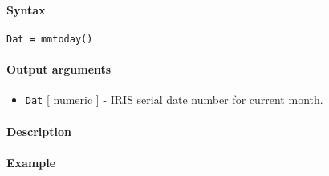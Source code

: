 


	\paragraph{Syntax}

\begin{verbatim}
Dat = mmtoday()
\end{verbatim}

\paragraph{Output arguments}

\begin{itemize}
\itemsep1pt\parskip0pt
\item
  \texttt{Dat} {[} numeric {]} - IRIS serial date number for current
  month.
\end{itemize}

\paragraph{Description}

\paragraph{Example}


